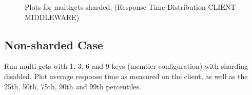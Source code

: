 \documentclass[11pt,a4paper]{article}
\begin{document}
\begin{figure}[!h]
  \centering
    \caption{Plots for multigets sharded, (Response Time Distribution CLIENT MIDDLEWARE)}
  \label{fig:multigets_sharded_mt_mw_rt_d}
\end{figure}

\subsection{Non-sharded Case}

Run multi-gets with 1, 3, 6 and 9 keys (memtier configuration) with sharding disabled. Plot average response time as measured on the client, as well as the 25th, 50th, 75th, 90th and 99th percentiles.
\end{document}
